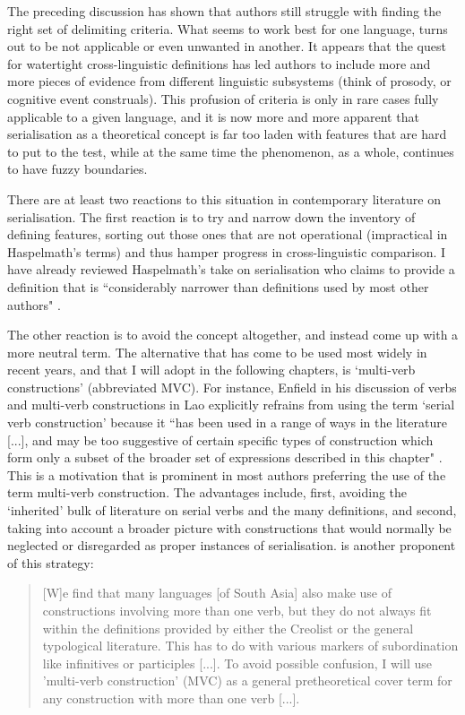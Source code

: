 The preceding discussion has shown that authors still struggle with finding the right set of delimiting criteria. What seems to work best for one language, turns out to be not applicable or even unwanted in another. It appears that the quest for watertight cross-linguistic definitions has led authors to include more and more pieces of evidence from different linguistic subsystems (think of prosody, or cognitive event construals). This profusion of criteria is only in rare cases fully applicable to a given language, and it is now more and more apparent that serialisation as a theoretical concept is far too laden with features that are hard to put to the test, while at the same time the phenomenon, as a whole, continues to have fuzzy boundaries. 

There are at least two reactions to this situation in contemporary literature on serialisation. The first reaction is to try and narrow down the inventory of defining features, sorting out those ones that are not operational (impractical in Haspelmath's terms) and thus hamper progress in cross-linguistic comparison. I have already reviewed Haspelmath's take on serialisation who claims to provide a definition that is ``considerably narrower than definitions used by most other authors" \citep[6]{haspelmath2016serial}. 

The other reaction is to avoid the concept altogether, and instead come up with a more neutral term. The alternative that has come to be used most widely in recent years, and that I will adopt in the following chapters, is `multi-verb constructions' (abbreviated MVC). For instance, Enfield in his discussion of verbs and multi-verb constructions in Lao explicitly refrains from using the term `serial verb construction' because it ``has been used in a range of ways in the literature [...], and may be too suggestive of certain specific types of construction which form only a subset of the broader set of expressions described in this chapter" \citep[104, footnote 17]{enfield2008verbs}. This is a motivation that is prominent in most authors preferring the use of the term multi-verb construction. The advantages include, first, avoiding the `inherited' bulk of literature on serial verbs and the many definitions, and second, taking into account a broader picture with constructions that would normally be neglected or disregarded as proper instances of serialisation. \citet[312]{nordhoff2012} is another proponent of this strategy:

\begin{quote}
[W]e find that many languages [of South Asia] also make use of constructions involving more than one verb, but they do not always fit within the definitions provided by either the Creolist or the general typological literature. This has to do with various markers of subordination like infinitives or participles [...]. To avoid possible confusion, I will use 'multi-verb construction' (MVC) as a general pretheoretical cover term for any construction with more than one verb [...].
\end{quote}

